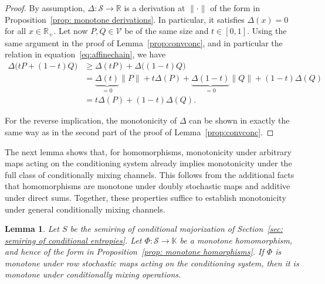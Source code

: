\documentclass[aps,pra,11pt,onecolumn,nofootinbib,tightenlines]{revtex4-2}
\newtheorem{lemma}[theorem]{Lemma}
\theoremstyle{definition}
\newcommand{\cS}{\mathcal{S}}
\newcommand{\V}{\mathcal{V}}
\newcommand{\mb}[1]{\mathbb{#1}}
\begin{document}
\begin{proof}
By assumption, $\Delta:\cS\to\mb R$ is a derivation at $\|\cdot\|$ of the form in Proposition~\ref{prop: monotone derivations}. In particular, it satisfies $\Delta(x)=0$ for all $x\in\mb R_+$. Let now $P,Q\in\V$ be of the same size and $t\in[0,1]$. Using the same argument in the proof of Lemma~\ref{prop:convconc}, and in particular the relation in equation~\eqref{eq:affinechain}, we have
\begin{align}
\Delta\big(tP+(1-t)Q\big)&\geq\Delta(tP)+\Delta\big((1-t)Q\big)\\
&=\underbrace{\Delta(t)}_{=0}\|P\|+t\Delta(P)+\underbrace{\Delta(1-t)}_{=0}\|Q\|+(1-t)\Delta(Q)\\
&=t\Delta(P)+(1-t)\Delta(Q).
\end{align}

For the reverse implication, the monotonicity of $\Delta$ can be shown in exactly the same way as in the second part of the proof of Lemma~\ref{prop:convconc}.
\end{proof}

The next lemma shows that, for homomorphisms, monotonicity under arbitrary maps acting on the conditioning system already implies monotonicity under the full class of conditionally mixing channels. This follows from the additional facts that homomorphisms are monotone under doubly stochastic maps and additive under direct sums. Together, these properties suffice to establish monotonicity under general conditionally mixing channels. 
\begin{lemma}
\label{lem: extension to general channels}
Let $S$ be the semiring of conditional majorization of Section~\ref{sec: semiring of conditional entropies}.
Let $\Phi: \cS \to \mathbb{K}$ be a monotone homomorphism, and hence of the form in Proposition~\ref{prop: monotone homorphisms}. If $\Phi$ is monotone under row stochastic maps acting on the conditioning system, then it is monotone under conditionally mixing operations.
\end{lemma}
\end{document}
